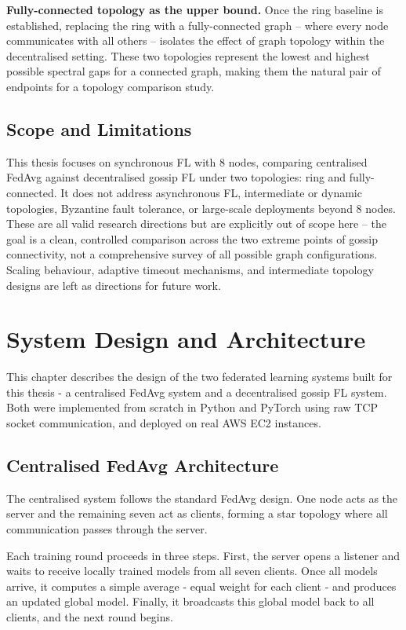 \documentclass[12pt]{report}
\begin{document}
\textbf{Fully-connected topology as the upper bound.} Once the ring baseline is
established, replacing the ring with a fully-connected graph -- where every node
communicates with all others -- isolates the effect of graph topology within the
decentralised setting. These two topologies represent the lowest and highest
possible spectral gaps for a connected graph, making them the natural pair of
endpoints for a topology comparison study.

\section{Scope and Limitations}

This thesis focuses on synchronous FL with 8 nodes, comparing centralised FedAvg
against decentralised gossip FL under two topologies: ring and fully-connected.
It does not address asynchronous FL, intermediate or dynamic topologies, Byzantine
fault tolerance, or large-scale deployments beyond 8 nodes. These are all valid
research directions but are explicitly out of scope here -- the goal is a clean,
controlled comparison across the two extreme points of gossip connectivity, not a
comprehensive survey of all possible graph configurations. Scaling behaviour,
adaptive timeout mechanisms, and intermediate topology designs are left as
directions for future work.

\chapter{System Design and Architecture}

This chapter describes the design of the two federated learning systems built
for this thesis - a centralised FedAvg system and a decentralised gossip FL
system. Both were implemented from scratch in Python and PyTorch using raw TCP
socket communication, and deployed on real AWS EC2 instances.

\section{Centralised FedAvg Architecture}

The centralised system follows the standard FedAvg design. One node acts as the
server and the remaining seven act as clients, forming a star topology where all
communication passes through the server.

Each training round proceeds in three steps. First, the server opens a listener
and waits to receive locally trained models from all seven clients. Once all
models arrive, it computes a simple average - equal weight for each client -
and produces an updated global model. Finally, it broadcasts this global model
back to all clients, and the next round begins.
\end{document}
